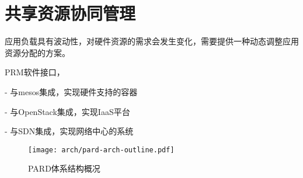 

\chapter{共享资源协同管理}
\label{chap:parddc}

应用负载具有波动性，对硬件资源的需求会发生变化，需要提供一种动态调整应用资源分配的方案。



PRM软件接口，

- 与mesos集成，实现硬件支持的容器

- 与OpenStack集成，实现IaaS平台

- 与SDN集成，实现网络中心的系统

\begin{figure}[tbh]
  \centering
  \texttt{[image: arch/pard-arch-outline.pdf]}
  \caption[PARD体系结构概况]{PARD体系结构概况}
  \label{fig:pard-arch-outline}
\end{figure}

